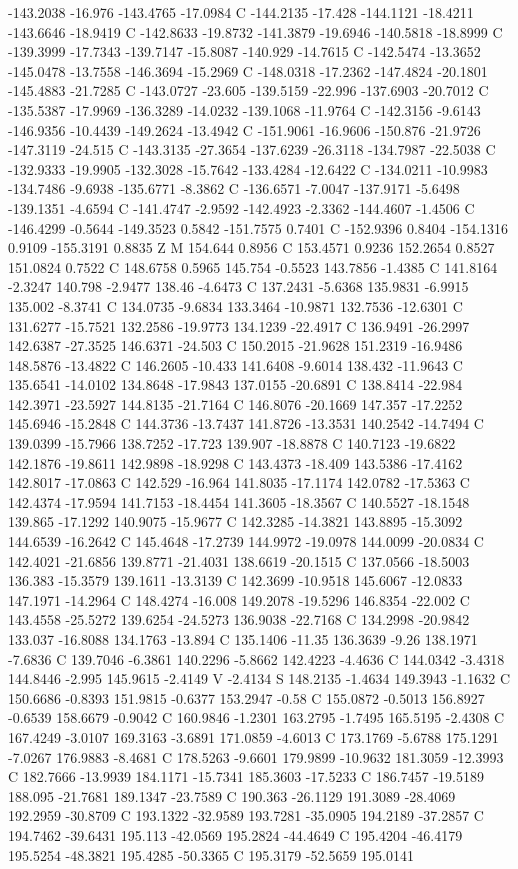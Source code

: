 {{{-143.2038 -16.976 -143.4765 -17.0984 C -144.2135 -17.428 -144.1121 -18.4211 -143.6646 -18.9419 C -142.8633 -19.8732 -141.3879 -19.6946 -140.5818 -18.8999 C -139.3999 -17.7343 -139.7147 -15.8087 -140.929 -14.7615 C -142.5474 -13.3652 -145.0478 -13.7558 -146.3694 -15.2969 C -148.0318 -17.2362 -147.4824 -20.1801 -145.4883 -21.7285 C -143.0727 -23.605 -139.5159 -22.996 -137.6903 -20.7012 C -135.5387 -17.9969 -136.3289 -14.0232 -139.1068 -11.9764 C -142.3156 -9.6143 -146.9356 -10.4439 -149.2624 -13.4942 C -151.9061 -16.9606 -150.876 -21.9726 -147.3119 -24.515 C -143.3135 -27.3654 -137.6239 -26.3118 -134.7987 -22.5038 C -132.9333 -19.9905 -132.3028 -15.7642 -133.4284 -12.6422 C -134.0211 -10.9983 -134.7486 -9.6938 -135.6771 -8.3862 C -136.6571 -7.0047 -137.9171 -5.6498 -139.1351 -4.6594 C -141.4747 -2.9592 -142.4923 -2.3362 -144.4607 -1.4506 C -146.4299 -0.5644 -149.3523 0.5842 -151.7575 0.7401 C -152.9396 0.8404 -154.1316 0.9109 -155.3191 0.8835 Z M 154.644 0.8956 C 153.4571 0.9236 152.2654 0.8527 151.0824 0.7522 C 148.6758 0.5965 145.754 -0.5523 143.7856 -1.4385 C 141.8164 -2.3247 140.798 -2.9477 138.46 -4.6473 C 137.2431 -5.6368 135.9831 -6.9915 135.002 -8.3741 C 134.0735 -9.6834 133.3464 -10.9871 132.7536 -12.6301 C 131.6277 -15.7521 132.2586 -19.9773 134.1239 -22.4917 C 136.9491 -26.2997 142.6387 -27.3525 146.6371 -24.503 C 150.2015 -21.9628 151.2319 -16.9486 148.5876 -13.4822 C 146.2605 -10.433 141.6408 -9.6014 138.432 -11.9643 C 135.6541 -14.0102 134.8648 -17.9843 137.0155 -20.6891 C 138.8414 -22.984 142.3971 -23.5927 144.8135 -21.7164 C 146.8076 -20.1669 147.357 -17.2252 145.6946 -15.2848 C 144.3736 -13.7437 141.8726 -13.3531 140.2542 -14.7494 C 139.0399 -15.7966 138.7252 -17.723 139.907 -18.8878 C 140.7123 -19.6822 142.1876 -19.8611 142.9898 -18.9298 C 143.4373 -18.409 143.5386 -17.4162 142.8017 -17.0863 C 142.529 -16.964 141.8035 -17.1174 142.0782 -17.5363 C 142.4374 -17.9594 141.7153 -18.4454 141.3605 -18.3567 C 140.5527 -18.1548 139.865 -17.1292 140.9075 -15.9677 C 142.3285 -14.3821 143.8895 -15.3092 144.6539 -16.2642 C 145.4648 -17.2739 144.9972 -19.0978 144.0099 -20.0834 C 142.4021 -21.6856 139.8771 -21.4031 138.6619 -20.1515 C 137.0566 -18.5003 136.383 -15.3579 139.1611 -13.3139 C 142.3699 -10.9518 145.6067 -12.0833 147.1971 -14.2964 C 148.4274 -16.008 149.2078 -19.5296 146.8354 -22.002 C 143.4558 -25.5272 139.6254 -24.5273 136.9038 -22.7168 C 134.2998 -20.9842 133.037 -16.8088 134.1763 -13.894 C 135.1406 -11.35 136.3639 -9.26 138.1971 -7.6836 C 139.7046 -6.3861 140.2296 -5.8662 142.4223 -4.4636 C 144.0342 -3.4318 144.8446 -2.995 145.9615 -2.4149 V -2.4134 S 148.2135 -1.4634 149.3943 -1.1632 C 150.6686 -0.8393 151.9815 -0.6377 153.2947 -0.58 C 155.0872 -0.5013 156.8927 -0.6539 158.6679 -0.9042 C 160.9846 -1.2301 163.2795 -1.7495 165.5195 -2.4308 C 167.4249 -3.0107 169.3163 -3.6891 171.0859 -4.6013 C 173.1769 -5.6788 175.1291 -7.0267 176.9883 -8.4681 C 178.5263 -9.6601 179.9899 -10.9632 181.3059 -12.3993 C 182.7666 -13.9939 184.1171 -15.7341 185.3603 -17.5233 C 186.7457 -19.5189 188.095 -21.7681 189.1347 -23.7589 C 190.363 -26.1129 191.3089 -28.4069 192.2959 -30.8709 C 193.1322 -32.9589 193.7281 -35.0905 194.2189 -37.2857 C 194.7462 -39.6431 195.113 -42.0569 195.2824 -44.4649 C 195.4204 -46.4179 195.5254 -48.3821 195.4285 -50.3365 C 195.3179 -52.5659 195.0141 }}}
